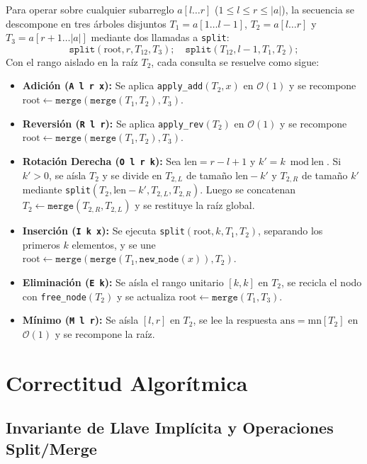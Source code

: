 \documentclass[journal,10pt,a4paper]{IEEEtran}
\begin{document}
Para operar sobre cualquier subarreglo $a[l \dots r]$ ($1 \le l \le r \le |a|$), la secuencia se descompone en tres árboles disjuntos $T_1 = a[1 \dots l-1]$, $T_2 = a[l \dots r]$ y $T_3 = a[r+1 \dots |a|]$ mediante dos llamadas a \texttt{split}:
\begin{equation}
    \texttt{split}(\text{root}, r, T_{12}, T_3); \quad \texttt{split}(T_{12}, l-1, T_1, T_2);
\end{equation}
Con el rango aislado en la raíz $T_2$, cada consulta se resuelve como sigue:
\begin{itemize}
    \item \textbf{Adición (\texttt{A l r x}):} Se aplica \texttt{apply\_add}$(T_2, x)$ en $\mathcal{O}(1)$ y se recompone $\text{root} \leftarrow \texttt{merge}(\texttt{merge}(T_1, T_2), T_3)$.
    \item \textbf{Reversión (\texttt{R l r}):} Se aplica \texttt{apply\_rev}$(T_2)$ en $\mathcal{O}(1)$ y se recompone $\text{root} \leftarrow \texttt{merge}(\texttt{merge}(T_1, T_2), T_3)$.
    \item \textbf{Rotación Derecha (\texttt{O l r k}):} Sea $\text{len} = r - l + 1$ y $k' = k \bmod \text{len}$. Si $k' > 0$, se aísla $T_2$ y se divide en $T_{2,L}$ de tamaño $\text{len} - k'$ y $T_{2,R}$ de tamaño $k'$ mediante \texttt{split}$(T_2, \text{len} - k', T_{2,L}, T_{2,R})$. Luego se concatenan $T_2 \leftarrow \texttt{merge}(T_{2,R}, T_{2,L})$ y se restituye la raíz global.
    \item \textbf{Inserción (\texttt{I k x}):} Se ejecuta \texttt{split}$(\text{root}, k, T_1, T_2)$, separando los primeros $k$ elementos, y se une $\text{root} \leftarrow \texttt{merge}(\texttt{merge}(T_1, \texttt{new\_node}(x)), T_2)$.
    \item \textbf{Eliminación (\texttt{E k}):} Se aísla el rango unitario $[k, k]$ en $T_2$, se recicla el nodo con \texttt{free\_node}$(T_2)$ y se actualiza $\text{root} \leftarrow \texttt{merge}(T_1, T_3)$.
    \item \textbf{Mínimo (\texttt{M l r}):} Se aísla $[l, r]$ en $T_2$, se lee la respuesta $\text{ans} = \text{mn}[T_2]$ en $\mathcal{O}(1)$ y se recompone la raíz.
\end{itemize}

\section{Correctitud Algorítmica}

\subsection{Invariante de Llave Implícita y Operaciones Split/Merge}
\end{document}
